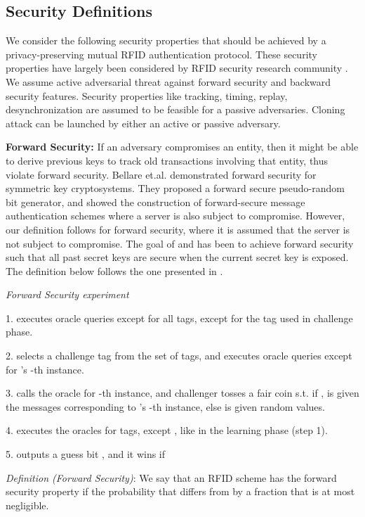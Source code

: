 \documentclass{easychair}
\begin{document}
\subsection{Security Definitions}
We consider the following security properties that should be achieved by a privacy-preserving mutual RFID authentication protocol. These security properties have largely been considered by RFID security research community \cite{cloning1,burmester,AutoID,dot,juels,cloning2,burmester1,replay,song,sm:bp}. We assume active adversarial threat against forward security and backward security features. Security properties like tracking, timing, replay, desynchronization are assumed to be feasible for a passive adversaries. Cloning attack can be launched by either an active or passive adversary.


\textbf{Forward Security:} If an adversary compromises an entity, then it might
be able to derive previous keys to track old transactions involving that 
entity, thus violate forward security. Bellare et.al. \cite{bellare:forward} demonstrated forward security for symmetric key cryptosystems. 
They proposed a forward secure pseudo-random
bit generator, and showed the construction of forward-secure message authentication schemes where a server is also subject to compromise. However, our definition follows \cite{song} for
 forward security, where it is assumed that the server is not subject to compromise. The goal of \cite{song} and \cite{bellare:forward} has been to achieve forward security such 
 that all past secret keys are secure when the current secret key is exposed. The definition below follows the one presented in \cite{fordsec}.
 
\textit{Forward Security experiment}

1.  executes oracle queries except  for all  tags, except for the tag  used in challenge phase.

2.  selects a challenge tag  from the set of  tags, and executes oracle queries except  for 's -th instance.

3.  calls the oracle  for -th instance, and challenger  tosses a fair coin  s.t. if ,  is given the messages corresponding to 's -th instance, else is given random values.

4.  executes the oracles for  tags, except , like in the learning phase (step 1).

5.  outputs a guess bit , and it wins if 

\textit{Definition (Forward Security)}: We say that an RFID scheme has the forward security property if the probability that  differs from  by a fraction that is at most negligible.
\end{document}
